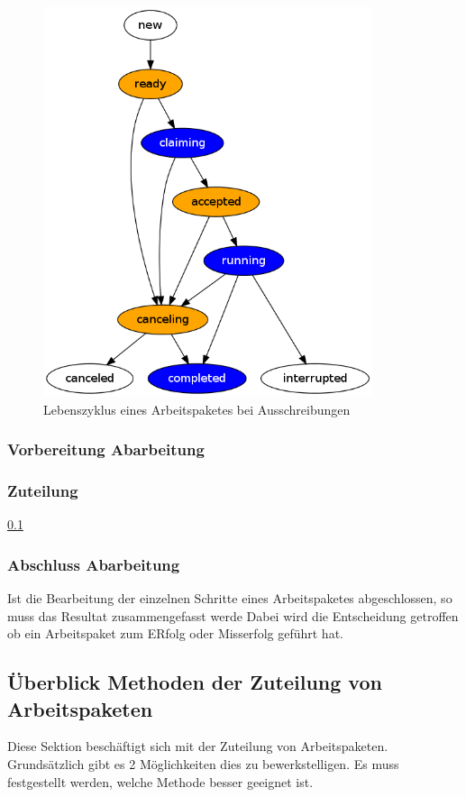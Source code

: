 \begin{figure}[ht] 
  \centering
  \includegraphics[height=4.5in]{imageinput/lebenszyklus-arbeitspaket.png}
  \caption{Lebenszyklus eines Arbeitspaketes bei Ausschreibungen}
  \label{fig:lebenszyklus-arbeitspaket}
\end{figure}


\subsubsection{Vorbereitung Abarbeitung}



\subsubsection{Zuteilung}
\cref{sec:methoden:zuteilung}

\subsubsection{Abschluss Abarbeitung}

Ist die Bearbeitung der einzelnen Schritte eines Arbeitspaketes abgeschlossen,
so muss das Resultat zusammengefasst werde 
Dabei wird die Entscheidung getroffen ob ein Arbeitspaket zum ERfolg oder Misserfolg geführt hat.

\subsection{Überblick Methoden der Zuteilung von Arbeitspaketen}
\label{sec:methoden:zuteilung}
Diese Sektion beschäftigt sich mit der Zuteilung von Arbeitspaketen.
Grundsätzlich gibt es 2 Möglichkeiten dies zu bewerkstelligen.
Es muss festgestellt werden, welche Methode besser geeignet ist.

